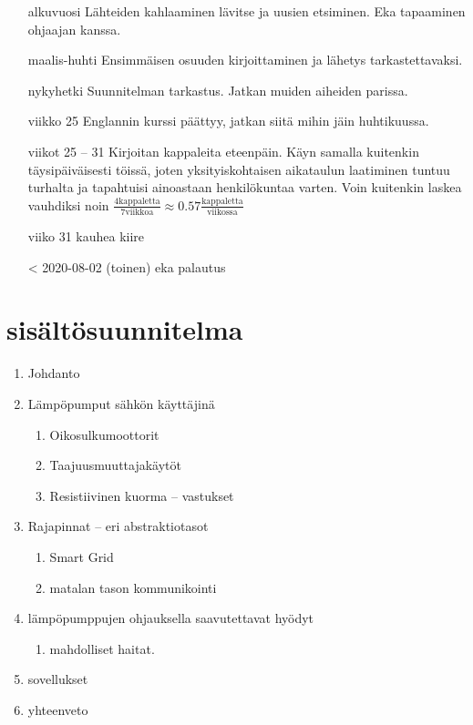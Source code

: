   \begin{itemize}
    \item[alkuvuosi] Lähteiden kahlaaminen lävitse ja uusien etsiminen. Eka tapaaminen ohjaajan kanssa.
    \item[maalis-huhti] Ensimmäisen osuuden kirjoittaminen ja lähetys tarkastettavaksi.
    \item[nykyhetki] Suunnitelman tarkastus. Jatkan muiden aiheiden parissa.
    \item[viikko 25] Englannin kurssi päättyy, jatkan siitä mihin jäin huhtikuussa. \item[viikot 25 -- 31] Kirjoitan kappaleita eteenpäin. Käyn samalla kuitenkin täysipäiväisesti töissä, joten yksityiskohtaisen aikataulun laatiminen tuntuu turhalta ja tapahtuisi ainoastaan henkilökuntaa varten. Voin kuitenkin laskea vauhdiksi noin $ \frac{4 \mathrm{ kappaletta}}{ 7 \mathrm{ viikkoa}} \approx  0.57 \frac{\mathrm{kappaletta}}{\mathrm{viikossa}}$
    \item[viiko 31] kauhea kiire
    \item[< 2020-08-02] (toinen) eka palautus
  \end{itemize}


\section{sisältösuunnitelma}

\begin{enumerate}
  \item Johdanto
  \item Lämpöpumput sähkön käyttäjinä
    \begin{enumerate}
      \item Oikosulkumoottorit
      \item Taajuusmuuttajakäytöt
      \item Resistiivinen kuorma -- vastukset
    \end{enumerate}
  \item Rajapinnat -- eri abstraktiotasot
  \begin{enumerate}
    \item Smart Grid
    \item matalan tason kommunikointi
  \end{enumerate}
  \item lämpöpumppujen ohjauksella saavutettavat hyödyt
  \begin{enumerate}
    \item mahdolliset haitat.
  \end{enumerate}
  \item sovellukset
  \item yhteenveto
\end{enumerate}



